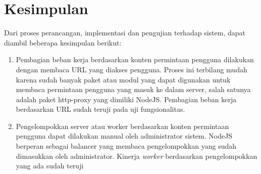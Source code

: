 \documentclass{ta-its}
\begin{document}
			\section{Kesimpulan}
				Dari proses perancangan, implementasi dan pengujian terhadap sistem, dapat diambil beberapa kesimpulan berikut:
				\begin{enumerate}
					\item Pembagian beban kerja berdasarkan konten permintaan pengguna dilakukan dengan membaca URL yang diakses pengguna. Proses ini terbilang mudah karena sudah banyak paket atau modul yang dapat digunakan untuk membaca permintaan pengguna yang masuk ke dalam server, salah satunya adalah paket http-proxy yang dimiliki NodeJS. Pembagian beban kerja berdasarkan URL sudah teruji pada uji fungsionalitas.
					\item Pengelompokkan server atau worker berdasarkan konten permintaan pengguna dapat dilakukan manual oleh administrator sistem. NodeJS berperan sebagai balancer yang membaca pengelompokkan yang sudah dimasukkan oleh administrator. Kinerja \textit{worker} berdasarkan pengelompokkan yang ada sudah teruji 
				\end{enumerate}

\appendix %

\backmatter %
\end{document}
